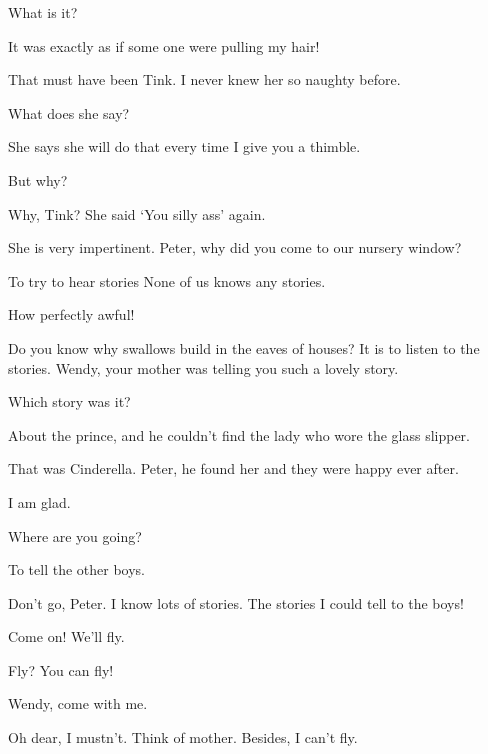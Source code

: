 \begin{drama}
\peterspeaks
What is it?

\wendyspeaks
It was exactly as if some one were pulling my hair!

\peterspeaks
That must have been Tink.
I never knew her so naughty before.


\wendyspeaks
What does she say?

\peterspeaks
She says she will do that every time I give you a thimble.

\wendyspeaks
But why?

Why, Tink?
She said ‘You silly ass’ again.

\wendyspeaks
She is very impertinent.
Peter, why did you come to our nursery window?

\peterspeaks
To try to hear stories None of us knows any stories.

\wendyspeaks
How perfectly awful!

\peterspeaks
Do you know why swallows build in the eaves of houses?
It is to listen to the stories.
Wendy, your mother was telling you such a lovely story.

\wendyspeaks
Which story was it?

\peterspeaks
About the prince, and he couldn’t find the lady who wore the glass slipper.

\wendyspeaks
That was Cinderella.
Peter, he found her and they were happy ever after.

\peterspeaks
I am glad.

\wendyspeaks
Where are you going?

To tell the other boys.

\wendyspeaks
Don’t go, Peter.
I know lots of stories.
The stories I could tell to the boys!

Come on!
We’ll fly.

\wendyspeaks
Fly?
You can fly!


\peterspeaks
Wendy, come with me.

\wendyspeaks
Oh dear, I mustn’t.
Think of mother.
Besides, I can’t fly.


\end{drama}
